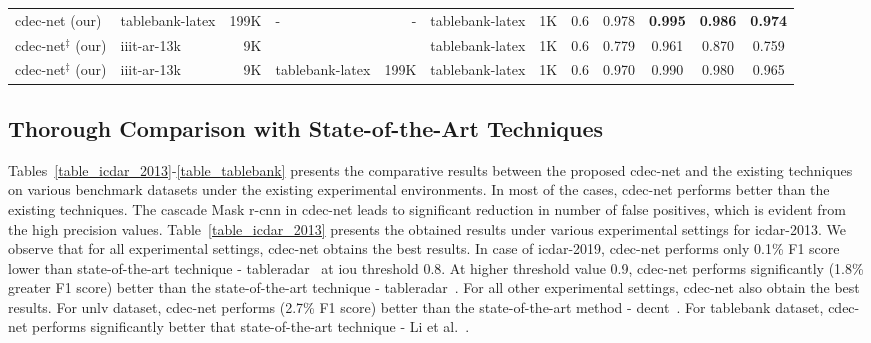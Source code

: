 \documentclass[a4paper,conference]{IEEEtran}
\begin{document}
\begin{table*}[ht!]
\begin{center}
\begin{tabular}{|l| l | r|l |r|l|r| c| c c c c|}
{\sc cd}e{\sc c-n}et (our)  &{\sc t}able{\sc b}ank-{\sc l}a{\sc t}e{\sc x} &199K &- &- &{\sc t}able{\sc b}ank-{\sc l}a{\sc t}e{\sc x} &1K &0.6 &0.978 &\textbf{0.995} &\textbf{0.986} &\textbf{0.974} \\ \hhline{|=|=|=|=|=|=|=|=|====|}
{\sc cd}e{\sc c-n}et$^{\ddagger}$ (our) &{\sc iiit-ar-13k} &9K & & &{\sc t}able{\sc b}ank-{\sc l}a{\sc t}e{\sc x} &1K &0.6 &0.779 &0.961 &0.870 &0.759 \\  
{\sc cd}e{\sc c-n}et$^{\ddagger}$ (our) &{\sc iiit-ar-13k} &9K &{\sc t}able{\sc b}ank-{\sc l}a{\sc t}e{\sc x} &199K &{\sc t}able{\sc b}ank-{\sc l}a{\sc t}e{\sc x} &1K &0.6 &0.970 &0.990 &0.980 &0.965 \\ \hline
\end{tabular}
\end{center}
\caption{Illustrates comparison between the proposed {\sc cd}e{\sc c-n}et (our) and state-of-the-art techniques on {\sc t}able{\sc b}ank dataset. {\sc cd}e{\sc c-n}et$^{\ddagger}$\textbf{:} indicates a single  model which is trained with {\sc iiit-ar-13k} dataset. \label{table_tablebank}}
\end{table*}

\subsection{Thorough Comparison with State-of-the-Art Techniques}

Tables~\ref{table_icdar_2013}-\ref{table_tablebank} presents the comparative results between the proposed {\sc cd}e{\sc c-n}et and the existing techniques on various benchmark datasets under the existing experimental environments. In most of the cases, {\sc cd}e{\sc c-n}et performs better than the existing techniques. The cascade Mask {\sc r-cnn} in {\sc cd}e{\sc c-n}et leads to significant reduction in number of false positives, which is evident from the high precision values. Table~\ref{table_icdar_2013} presents the obtained results under various experimental settings for {\sc icdar-2013}. We observe that for all experimental settings, {\sc cd}e{\sc c-n}et obtains the best results. In case of {\sc icdar-2019}, {\sc cd}e{\sc c-n}et performs only 0.1\% F1 score lower than state-of-the-art technique - {\sc t}able{\sc r}adar~\cite{gao2019icdar} at {\sc i}o{\sc u} threshold 0.8. At higher threshold value 0.9, {\sc cd}e{\sc c-n}et performs significantly (1.8\% greater F1 score) better than the state-of-the-art technique - {\sc t}able{\sc r}adar~\cite{gao2019icdar}. For all other experimental settings, {\sc cd}e{\sc c-n}et also obtain the best results. For {\sc unlv} dataset, {\sc cd}e{\sc c-n}et performs (2.7\% F1 score) better than the state-of-the-art method - {\sc d}e{\sc cnt}~\cite{siddiqui2018decnt}. For {\sc t}able{\sc b}ank dataset, {\sc cd}e{\sc c-n}et performs significantly  better that state-of-the-art technique - Li et al.~\cite{li2019tablebank}.              
\end{document}
